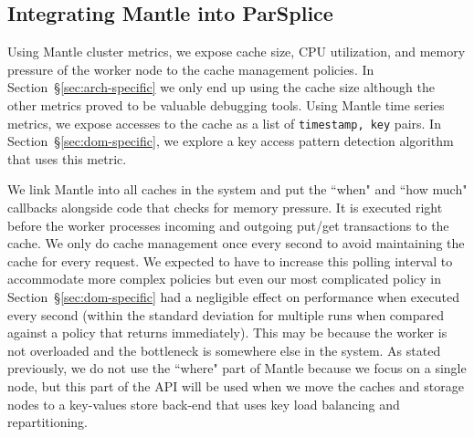\subsection{Integrating Mantle into ParSplice}

Using Mantle cluster metrics, we expose cache size, CPU utilization, and memory
pressure of the worker node to the cache management policies. In
Section~\S\ref{sec:arch-specific} we only end up using the cache size although
the other metrics proved to be valuable debugging tools. Using Mantle time
series metrics, we expose accesses to the cache as a list of \texttt{timestamp,
key} pairs. In Section~\S\ref{sec:dom-specific}, we explore a key access
pattern detection algorithm that uses this metric.

We link Mantle into all caches in the system and put the ``when" and ``how
much" callbacks alongside code that checks for memory pressure. It is executed
right before the worker processes incoming and outgoing put/get transactions to
the cache. We only do cache management once every second to avoid maintaining
the cache for every request. We expected to have to increase this polling
interval to accommodate more complex policies but even our most complicated
policy in Section~\S\ref{sec:dom-specific} had a negligible effect on
performance when executed every second (within the standard deviation for
multiple runs when compared against a policy that returns immediately). This
may be because the worker is not overloaded and the bottleneck is somewhere
else in the system.  As stated previously, we do not use the ``where" part of
Mantle because we focus on a single node, but this part of the API will be used
when we move the caches and storage nodes to a key-values store back-end that
uses key load balancing and repartitioning.
